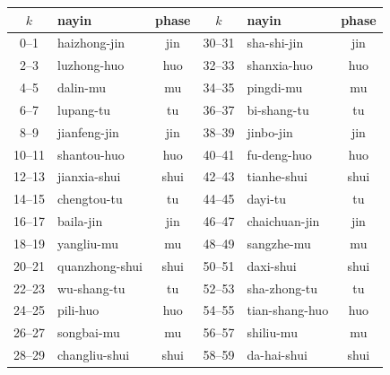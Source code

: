 \documentclass[11pt,a4paper]{article}
\theoremstyle{definition}
\theoremstyle{remark}
\begin{document}
\begin{center}\footnotesize
\begin{tabular}{c|l|c||c|l|c}
\hline
$k$ & nayin & phase & $k$ & nayin & phase\\ \hline
0--1   & haizhong-jin   & jin & 30--31 & sha-shi-jin    & jin\\
2--3   & luzhong-huo    & huo & 32--33 & shanxia-huo    & huo\\
4--5   & dalin-mu       & mu  & 34--35 & pingdi-mu      & mu\\
6--7   & lupang-tu      & tu  & 36--37 & bi-shang-tu    & tu\\
8--9   & jianfeng-jin   & jin & 38--39 & jinbo-jin      & jin\\
10--11 & shantou-huo    & huo & 40--41 & fu-deng-huo    & huo\\
12--13 & jianxia-shui   & shui& 42--43 & tianhe-shui    & shui\\
14--15 & chengtou-tu    & tu  & 44--45 & dayi-tu        & tu\\
16--17 & baila-jin      & jin & 46--47 & chaichuan-jin  & jin\\
18--19 & yangliu-mu     & mu  & 48--49 & sangzhe-mu     & mu\\
20--21 & quanzhong-shui & shui& 50--51 & daxi-shui      & shui\\
22--23 & wu-shang-tu    & tu  & 52--53 & sha-zhong-tu   & tu\\
24--25 & pili-huo       & huo & 54--55 & tian-shang-huo & huo\\
26--27 & songbai-mu     & mu  & 56--57 & shiliu-mu      & mu\\
28--29 & changliu-shui  & shui& 58--59 & da-hai-shui    & shui\\ \hline
\end{tabular}
\end{center}
\end{document}
